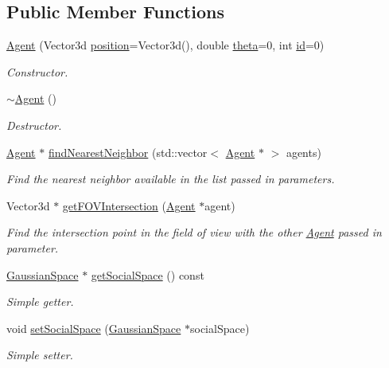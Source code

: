 \subsection*{Public Member Functions}
\begin{DoxyCompactItemize}
\item 
\hyperlink{classAgent_add6bcb014f4572bf90e489dbd35df597}{Agent} (Vector3d \hyperlink{classLocalizedObject_a340834deefc9e5c39da1f26c4ebf4f8c}{position}=Vector3d(), double \hyperlink{classLocalizedObject_aa5f7b070b6dc97a64a90797a0bca56e2}{theta}=0, int \hyperlink{classIdentifiedObject_ad044a317a9b573a3d1bcd025df166eb5}{id}=0)
\begin{DoxyCompactList}\small\item\em Constructor. \end{DoxyCompactList}\item 
\hyperlink{classAgent_ab8dd8d152605cf1339fed595376e83cb}{$\sim$\+Agent} ()
\begin{DoxyCompactList}\small\item\em Destructor. \end{DoxyCompactList}\item 
\hyperlink{classAgent}{Agent} $\ast$ \hyperlink{classAgent_a7ccfca9f14ee9d5afda1ac12effd1a33}{find\+Nearest\+Neighbor} (std\+::vector$<$ \hyperlink{classAgent}{Agent} $\ast$ $>$ agents)
\begin{DoxyCompactList}\small\item\em Find the nearest neighbor available in the list passed in parameters. \end{DoxyCompactList}\item 
Vector3d $\ast$ \hyperlink{classAgent_aef81d0795b37875777ca21d6d866ce31}{get\+F\+O\+V\+Intersection} (\hyperlink{classAgent}{Agent} $\ast$agent)
\begin{DoxyCompactList}\small\item\em Find the intersection point in the field of view with the other \hyperlink{classAgent}{Agent} passed in parameter. \end{DoxyCompactList}\item 
\hyperlink{classGaussianSpace}{Gaussian\+Space} $\ast$ \hyperlink{classAgent_aa42fced9ebe2bfec4b789ae5ed714bba}{get\+Social\+Space} () const 
\begin{DoxyCompactList}\small\item\em Simple getter. \end{DoxyCompactList}\item 
void \hyperlink{classAgent_a6b113ba7509327039373927a2e8a4e4c}{set\+Social\+Space} (\hyperlink{classGaussianSpace}{Gaussian\+Space} $\ast$social\+Space)
\begin{DoxyCompactList}\small\item\em Simple setter. \end{DoxyCompactList}\end{DoxyCompactItemize}
